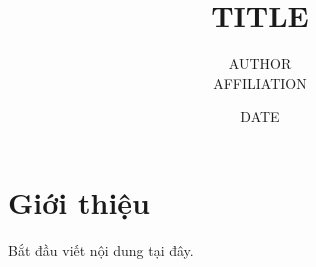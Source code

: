 \documentclass{article}
\title{{{TITLE}}}
\author{{{AUTHOR}} \\ {{AFFILIATION}}}
\date{{{DATE}}}
\begin{document}
\maketitle
\section{Giới thiệu}
Bắt đầu viết nội dung tại đây.
\end{document}
